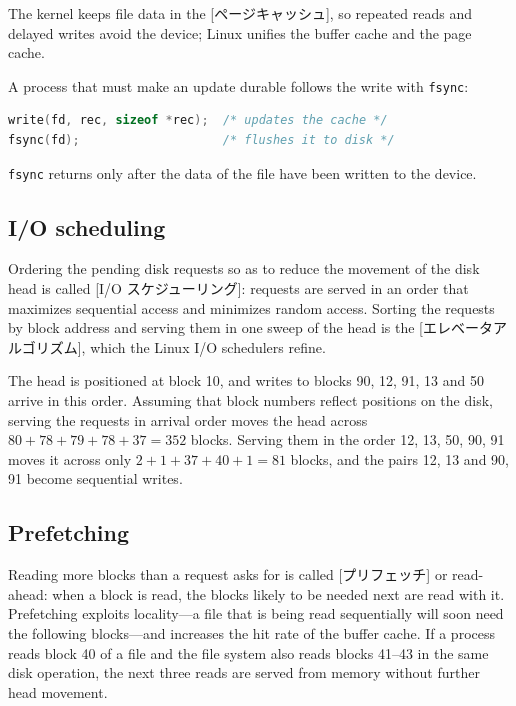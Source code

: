 \documentclass[../main.tex]{subfiles}
\begin{document}
The kernel keeps file data in the [ページキャッシュ], so
repeated reads and delayed writes avoid the device; Linux unifies the
buffer cache and the page cache.

A process that must make an update durable follows the write with
\texttt{fsync}:
\begin{lstlisting}[language=C, numbers=none]
write(fd, rec, sizeof *rec);  /* updates the cache */
fsync(fd);                    /* flushes it to disk */
\end{lstlisting}
\texttt{fsync} returns only after the data of the file have been written to
the device.

\subsection{I/O scheduling}

Ordering the pending disk requests so as to reduce the movement of the disk
head is called [I/O スケジューリング]: requests are
served in an order that maximizes sequential access and minimizes random
access.  Sorting the requests by block address and serving them in one sweep
of the head is the [エレベータアルゴリズム], which
the Linux I/O schedulers refine.

\begin{example}
  The head is positioned at block 10, and writes to blocks 90, 12, 91, 13
  and 50 arrive in this order.  Assuming that block numbers reflect
  positions on the disk, serving the requests in arrival order moves the
  head across $80+78+79+78+37 = 352$ blocks.  Serving them in the order 12,
  13, 50, 90, 91 moves it across only $2+1+37+40+1 = 81$ blocks, and the
  pairs 12, 13 and 90, 91 become sequential writes.
\end{example}

\subsection{Prefetching}

Reading more blocks than a request asks for is called
[プリフェッチ] or read-ahead: when a block is read, the
blocks likely to be needed next are read with it.  Prefetching exploits locality---a file that
is being read sequentially will soon need the following blocks---and
increases the hit rate of the buffer cache.  If a process reads block 40 of
a file and the file system also reads blocks 41--43 in the same disk
operation, the next three reads are served from memory without further
head movement.
\end{document}
